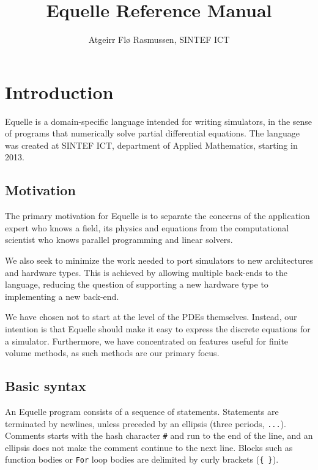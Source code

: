 \documentclass[11pt]{article}
\title{Equelle Reference Manual}
\author{Atgeirr Fl{\o} Rasmussen, SINTEF ICT}
\date{}
\newcommand{\code}[1]{\texttt{#1}}
\begin{document}
\maketitle

\newpage

\tableofcontents

\newpage

\section{Introduction}

Equelle is a domain-specific language intended for writing simulators, in the sense of
programs that numerically solve partial differential equations. The language was created
at SINTEF ICT, department of Applied Mathematics, starting in 2013.

\subsection{Motivation}

The primary motivation for Equelle is to separate the concerns of the application expert
who knows a field, its physics and equations from the computational scientist who knows
parallel programming and linear solvers.

We also seek to minimize the work needed to port simulators to new architectures and
hardware types. This is achieved by allowing multiple back-ends to the language, reducing
the question of supporting a new hardware type to implementing a new back-end.

We have chosen not to start at the level of the PDEs themselves. Instead, our intention is
that Equelle should make it easy to express the discrete equations for a simulator.
Furthermore, we have concentrated on features useful for finite volume methods, as such
methods are our primary focus.

\subsection{Basic syntax}

An Equelle program consists of a sequence of statements. Statements are terminated by
newlines, unless preceded by an ellipsis (three periods, \code{...}). Comments starts with
the hash character \code{\#} and run to the end of the line, and an ellipsis does not make
the comment continue to the next line. Blocks such as function bodies or \code{For} loop
bodies are delimited by curly brackets (\code{\{ \}}).
\end{document}
